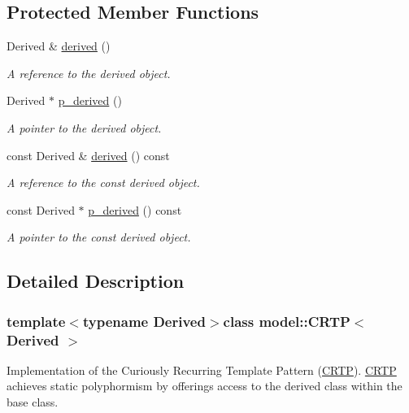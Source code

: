 \subsection*{Protected Member Functions}
\begin{DoxyCompactItemize}
\item 
Derived \& \hyperlink{classmodel_1_1_c_r_t_p_a0b4b744441231d031bd33c0c822a5c41}{derived} ()
\begin{DoxyCompactList}\small\item\em A reference to the derived object. \end{DoxyCompactList}\item 
Derived $\ast$ \hyperlink{classmodel_1_1_c_r_t_p_a8b45c2b163e8d2ae5d282b01de727fc7}{p\+\_\+derived} ()
\begin{DoxyCompactList}\small\item\em A pointer to the derived object. \end{DoxyCompactList}\item 
const Derived \& \hyperlink{classmodel_1_1_c_r_t_p_a6777ea629e6eeba2c5672963173c0e6a}{derived} () const 
\begin{DoxyCompactList}\small\item\em A reference to the const derived object. \end{DoxyCompactList}\item 
const Derived $\ast$ \hyperlink{classmodel_1_1_c_r_t_p_a4c6c989e61877bdc014a6d2b37926146}{p\+\_\+derived} () const 
\begin{DoxyCompactList}\small\item\em A pointer to the const derived object. \end{DoxyCompactList}\end{DoxyCompactItemize}


\subsection{Detailed Description}
\subsubsection*{template$<$typename Derived$>$class model\+::\+C\+R\+T\+P$<$ Derived $>$}

Implementation of the Curiously Recurring Template Pattern (\hyperlink{classmodel_1_1_c_r_t_p}{C\+R\+T\+P}). \hyperlink{classmodel_1_1_c_r_t_p}{C\+R\+T\+P} achieves static polyphormism by offerings access to the derived class within the base class. 


